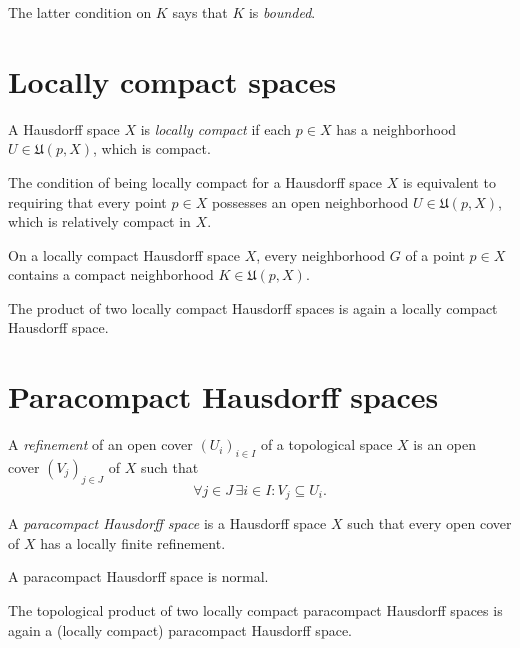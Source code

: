 The latter condition on $K$ says that $K$ is \emph{bounded}.

\section{Locally compact spaces}
\label{sec:locally_compact}

\begin{dfn}
  A Hausdorff space $X$ is \emph{locally compact} if each $p \in X$ has a
  neighborhood $U \in \mathfrak U(p, X)$, which is compact.
\end{dfn}
The condition of being locally compact for a Hausdorff space $X$ is equivalent to
requiring that every point $p \in X$ possesses an open neighborhood $U \in \mathfrak U(p, X)$,
which is relatively compact in $X$.

\begin{prop}
  \label{prop:locally_compact}
  On a locally compact Hausdorff space $X$, every neighborhood $G$ of a point $p \in X$
  contains a compact neighborhood $K \in \mathfrak U(p, X)$.
\end{prop}

The product of two locally compact Hausdorff spaces is again a locally compact
Hausdorff space.

\section{Paracompact Hausdorff spaces}
\label{sec:paracompactness}

A \emph{refinement} of an open cover $(U_i)_{i \in I}$ of a topological space $X$
is an open cover $(V_j)_{j \in J}$ of $X$ such that
\[
  \forall j \in J \, \exists i \in I: V_j \subseteq U_i.
\]

\begin{dfn}
  A \emph{paracompact Hausdorff space} is a Hausdorff space $X$ such that every
  open cover of $X$ has a locally finite refinement.
\end{dfn}

\begin{prop}
  \label{prop:paracompact_spaces}
  A paracompact Hausdorff space is normal.
\end{prop}

\begin{thm}
  The topological product of two locally compact paracompact Hausdorff spaces
  is again a (locally compact) paracompact Hausdorff space. 
\end{thm}

